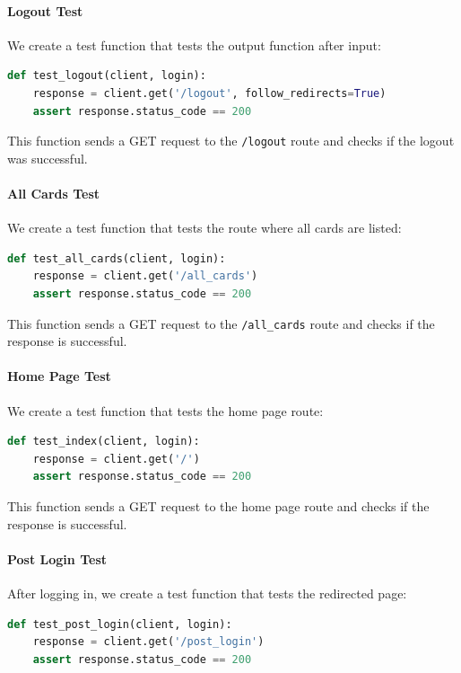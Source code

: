 \paragraph{Logout Test}
We create a test function that tests the output function after input:

\begin{lstlisting}[language=Python]
def test_logout(client, login):
    response = client.get('/logout', follow_redirects=True)
    assert response.status_code == 200
\end{lstlisting}

This function sends a GET request to the \texttt{/logout} route and checks if the logout was successful.\newpage

\paragraph{All Cards Test}
We create a test function that tests the route where all cards are listed:

\begin{lstlisting}[language=Python]
def test_all_cards(client, login):
    response = client.get('/all_cards')
    assert response.status_code == 200
\end{lstlisting}

This function sends a GET request to the \texttt{/all\_cards} route and checks if the response is successful.

\paragraph{Home Page Test}
We create a test function that tests the home page route:

\begin{lstlisting}[language=Python]
def test_index(client, login):
    response = client.get('/')
    assert response.status_code == 200
\end{lstlisting}

This function sends a GET request to the home page route and checks if the response is successful.

\paragraph{Post Login Test}
After logging in, we create a test function that tests the redirected page:

\begin{lstlisting}[language=Python]
def test_post_login(client, login):
    response = client.get('/post_login')
    assert response.status_code == 200
\end{lstlisting}

